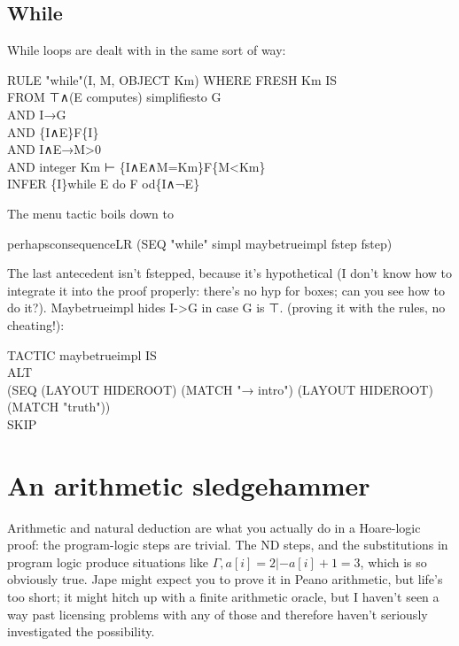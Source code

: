 \subsection{While}

While loops are dealt with in the same sort of way:
\begin{japeish}
RULE "while"(I, M, OBJECT Km) WHERE FRESH Km IS \\
\tab FROM ⊤∧(E computes) simplifiesto G \\
\tab AND I→G  \\
\tab AND \{I∧E\}F\{I\} \\
\tab AND I∧E→M>0 \\
\tab AND integer Km  ⊢ \{I∧E∧M=Km\}F\{M<Km\} \\
\tab INFER \{I\}while E do F od\{I∧¬E\}
\end{japeish}
The menu tactic boils down to
\begin{japeish}
perhapsconsequenceLR (SEQ "while" simpl maybetrueimpl fstep fstep)
\end{japeish}
The last antecedent isn't fstepped, because it's hypothetical (I don't know how to integrate it into the proof properly: there's no hyp for boxes; can you see how to do it?). Maybetrueimpl hides I->G in case G is ⊤. (proving it with the rules, no cheating!):
\begin{japeish}
TACTIC maybetrueimpl IS \\
\tab ALT \\
\tab \tab (SEQ (LAYOUT HIDEROOT) (MATCH "→ intro") (LAYOUT HIDEROOT) (MATCH "truth")) \\
\tab \tab SKIP
\end{japeish}

\section{An arithmetic sledgehammer}

Arithmetic and natural deduction are what you actually do in a Hoare-logic proof: the program-logic steps are trivial. The ND steps, and the substitutions in program logic produce situations like $\Gamma, a[i]=2 |- a[i]+1=3$, which is so obviously true. Jape might expect you to prove it in Peano arithmetic, but life's too short; it might hitch up with a finite arithmetic oracle, but I haven't seen a way past licensing problems with any of those and therefore haven't seriously investigated the possibility.

